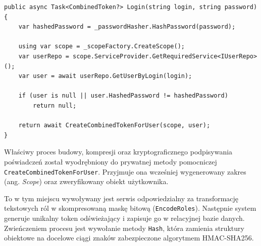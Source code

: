 \documentclass{SGGW-thesis}
\begin{document}
\vspace{2cm}

\begin{minipage}{\textwidth}
\begin{lstlisting}    
public async Task<CombinedToken?> Login(string login, string password)
{
    var hashedPassword = _passwordHasher.HashPassword(password);

    using var scope = _scopeFactory.CreateScope();
    var userRepo = scope.ServiceProvider.GetRequiredService<IUserRepo>();
    var user = await userRepo.GetUserByLogin(login);

    if (user is null || user.HashedPassword != hashedPassword)
        return null;

    return await CreateCombinedTokenForUser(scope, user);
}
\end{lstlisting}
\end{minipage}

\vspace{2cm}

Właściwy proces budowy, kompresji oraz kryptograficznego podpisywania poświadczeń został wyodrębniony do prywatnej metody pomocniczej \texttt{CreateCombinedTokenForUser}. Przyjmuje ona wcześniej wygenerowany zakres (ang. \textit{Scope}) oraz zweryfikowany obiekt użytkownika. 

To w tym miejscu wywoływany jest serwis odpowiedzialny za transformację tekstowych ról w skompresowaną maskę bitową (\texttt{EncodeRoles}). Następnie system generuje unikalny token odświeżający i zapisuje go w relacyjnej bazie danych. Zwieńczeniem procesu jest wywołanie metody \texttt{Hash}, która zamienia struktury obiektowe na docelowe ciągi znaków zabezpieczone algorytmem HMAC-SHA256.

\clearpage
\end{document}

